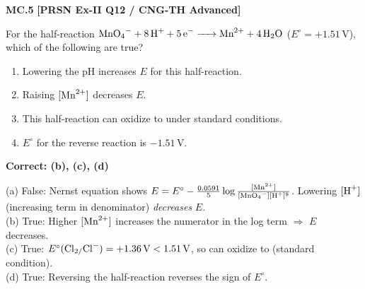 \begin{problembox}
\textbf{MC.5} \hfill \textbf{[PRSN Ex-II Q12 / CNG-TH Advanced]}

For the half-reaction $\ce{MnO4- + 8H+ + 5e- -> Mn^2+ + 4H2O}$ ($E^\circ = +1.51\,\text{V}$), which of the following are true?
\begin{enumerate}[label=(\alph*)]
    \item Lowering the pH increases $E$ for this half-reaction.
    \item Raising $[\ce{Mn^2+}]$ decreases $E$.
    \item This half-reaction can oxidize  to  under standard conditions.
    \item $E^\circ$ for the reverse reaction is $-1.51\,\text{V}$.
\end{enumerate}
\end{problembox}
\begin{solution}
\textbf{Correct: (b), (c), (d)}

(a) False: Nernst equation shows $E = E^\circ - \frac{0.0591}{5}\log\frac{[\ce{Mn^2+}]}{[\ce{MnO4-}][\ce{H+}]^8}$. Lowering $[\ce{H+}]$ (increasing term in denominator) \textit{decreases} $E$. \texttimes\\
(b) True: Higher $[\ce{Mn^2+}]$ increases the numerator in the log term $\Rightarrow$ $E$ decreases. \checkmark\\
(c) True: $E^\circ(\ce{Cl2/Cl-}) = +1.36\,\text{V} < 1.51\,\text{V}$, so  can oxidize  to  (standard condition). \checkmark\\
(d) True: Reversing the half-reaction reverses the sign of $E^\circ$. \checkmark
\end{solution}
